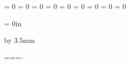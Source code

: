 


\newif\ifToc
\newif\ifIdx
\newif\ifRef

\newif\ifLocalEqnNumbering

\newif\ifShowLabels


\newwrite\TOC
\newwrite\IDX
\newwrite\REF

\def\MakeRef#1#2{%
	\makecom{#1}{#2}%
	\ifRef
		\immediate\write\REF{\string\makecom{#1}{#2}}%
	\fi
}


\newcount\eqn		\eqn		= 0
\newcount\tabn		\tabn		= 0				%
\newcount\gtabn		\gtabn		= 0				%
\newcount\fign		\fign		= 0
\newcount\bookn		\bookn		= 0
\newcount\bibn		\bibn		= 0
\newcount{}	{}	= 0
\newcount\nftn		\nftn		= 0				%
\newcount\abbn		\abbn		= 0				%

\newcount\iter									%

\newdimen\pageamp	\pageamp 	= 0in			%



\vsize=239.2mm
\hsize=159.2mm
\advance\voffset by 3.5mm	%

\def\forceoddpage{\ifodd\pageno\else{\def\makeheadline{}\vbox to0pt{}\vfil\eject}\fi}


\def\Output{\ifodd\pageno\hoffset=\pageamp\else\hoffset=-\pageamp\fi\plainoutput}
\output={\Output}


\def\BeginText{%
	\ifRef
		\jobname.ref
		\immediate\openout\REF\jobname.ref%
	\fi
	\pageno=1
}

